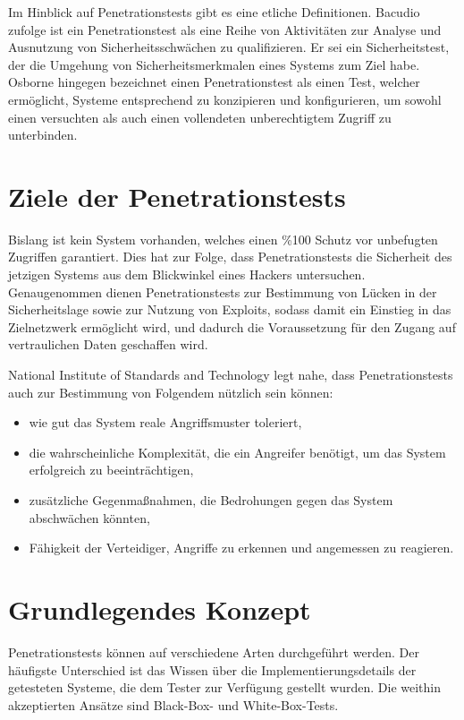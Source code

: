 Im Hinblick auf Penetrationstests gibt es eine etliche Definitionen. Bacudio\cite{bacudio2011overview} zufolge ist ein Penetrationstest als eine Reihe von Aktivitäten zur Analyse und Ausnutzung von Sicherheitsschwächen zu qualifizieren. Er sei ein Sicherheitstest, der die Umgehung von Sicherheitsmerkmalen eines Systems zum Ziel habe\cite{wack2003guideline}. Osborne\cite{osborne2006cheat} hingegen bezeichnet einen Penetrationstest als einen Test, welcher ermöglicht, Systeme entsprechend zu konzipieren und konfigurieren, um sowohl einen versuchten als auch einen vollendeten unberechtigtem Zugriff zu unterbinden.

\section{Ziele der Penetrationstests}

Bislang ist kein System vorhanden, welches einen \%100 Schutz vor unbefugten Zugriffen garantiert. Dies hat zur Folge, dass Penetrationstests die Sicherheit des jetzigen Systems aus dem Blickwinkel eines Hackers untersuchen. Genaugenommen dienen Penetrationstests zur Bestimmung von Lücken in der Sicherheitslage sowie zur Nutzung von Exploits, sodass damit ein Einstieg in das Zielnetzwerk ermöglicht wird, und dadurch die Voraussetzung für den  Zugang auf vertraulichen Daten geschaffen wird\cite{yeo2013using}.

National Institute of Standards and Technology legt nahe, dass Penetrationstests auch zur Bestimmung von Folgendem nützlich sein können\cite{scarfone2008technical}: 

\begin{itemize}
	\item wie gut das System reale Angriffsmuster toleriert,
	\item die wahrscheinliche Komplexität, die ein Angreifer benötigt, um das System erfolgreich zu beeinträchtigen,
	\item zusätzliche Gegenmaßnahmen, die Bedrohungen gegen das System abschwächen könnten,
	\item Fähigkeit der Verteidiger, Angriffe zu erkennen und angemessen zu reagieren.
\end{itemize}

\section{Grundlegendes Konzept}
\label{grndlgndkonzpt}

Penetrationstests können auf verschiedene Arten durchgeführt werden. Der häufigste Unterschied ist das Wissen über die Implementierungsdetails der getesteten Systeme, die dem Tester zur Verfügung gestellt wurden. Die weithin akzeptierten Ansätze sind Black-Box- und White-Box-Tests.

